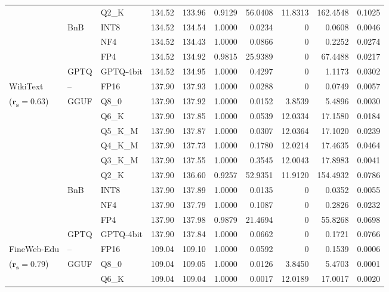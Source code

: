 \begin{longtable}{ll l rrrrrrr}
 &  & Q2\_K & 134.52 & 133.96 & \cellcolor{red!18} 0.9129 & \cellcolor{red!18} 56.0408 & 11.8313 & \cellcolor{red!18} 162.4548 & \cellcolor{red!18} 0.1025 \\
 & BnB & INT8 & 134.52 & 134.54 & 1.0000 & 0.0234 & \cellcolor{cyan!12} $0$ & 0.0608 & 0.0046 \\
 &  & NF4 & 134.52 & 134.43 & 1.0000 & 0.0866 & \cellcolor{cyan!12} $0$ & 0.2252 & 0.0274 \\
 &  & FP4 & 134.52 & 134.92 & 0.9815 & 25.9389 & \cellcolor{cyan!12} $0$ & 67.4488 & 0.0217 \\
 & GPTQ & GPTQ-4bit & 134.52 & 134.95 & 1.0000 & 0.4297 & \cellcolor{cyan!12} $0$ & 1.1173 & 0.0302 \\
\midrule
WikiText & -- & FP16 & 137.90 & 137.93 & 1.0000 & 0.0288 & \cellcolor{cyan!12} $0$ & 0.0749 & 0.0057 \\
{\small ($\mathbf{r_s{=}0.63}$)} & GGUF & Q8\_0 & 137.90 & 137.92 & 1.0000 & 0.0152 & 3.8539 & 5.4896 & 0.0030 \\
 &  & Q6\_K & 137.90 & 137.85 & 1.0000 & 0.0539 & 12.0334 & 17.1580 & 0.0184 \\
 &  & Q5\_K\_M & 137.90 & 137.87 & 1.0000 & 0.0307 & 12.0364 & 17.1020 & 0.0239 \\
 &  & Q4\_K\_M & 137.90 & 137.73 & 1.0000 & 0.1780 & 12.0214 & 17.4635 & 0.0464 \\
 &  & Q3\_K\_M & 137.90 & 137.55 & 1.0000 & 0.3545 & 12.0043 & 17.8983 & 0.0041 \\
 &  & Q2\_K & 137.90 & 136.60 & \cellcolor{red!18} 0.9257 & \cellcolor{red!18} 52.9351 & 11.9120 & \cellcolor{red!18} 154.4932 & \cellcolor{red!18} 0.0786 \\
 & BnB & INT8 & 137.90 & 137.89 & 1.0000 & 0.0135 & \cellcolor{cyan!12} $0$ & 0.0352 & 0.0055 \\
 &  & NF4 & 137.90 & 137.79 & 1.0000 & 0.1087 & \cellcolor{cyan!12} $0$ & 0.2826 & 0.0232 \\
 &  & FP4 & 137.90 & 137.98 & 0.9879 & 21.4694 & \cellcolor{cyan!12} $0$ & 55.8268 & 0.0698 \\
 & GPTQ & GPTQ-4bit & 137.90 & 137.84 & 1.0000 & 0.0662 & \cellcolor{cyan!12} $0$ & 0.1721 & 0.0766 \\
\midrule
FineWeb-Edu & -- & FP16 & 109.04 & 109.10 & 1.0000 & 0.0592 & \cellcolor{cyan!12} $0$ & 0.1539 & 0.0006 \\
{\small ($\mathbf{r_s{=}0.79}$)} & GGUF & Q8\_0 & 109.04 & 109.05 & 1.0000 & 0.0126 & 3.8450 & 5.4703 & 0.0001 \\
 &  & Q6\_K & 109.04 & 109.04 & 1.0000 & 0.0017 & 12.0189 & 17.0017 & 0.0020 \\

\end{longtable}
